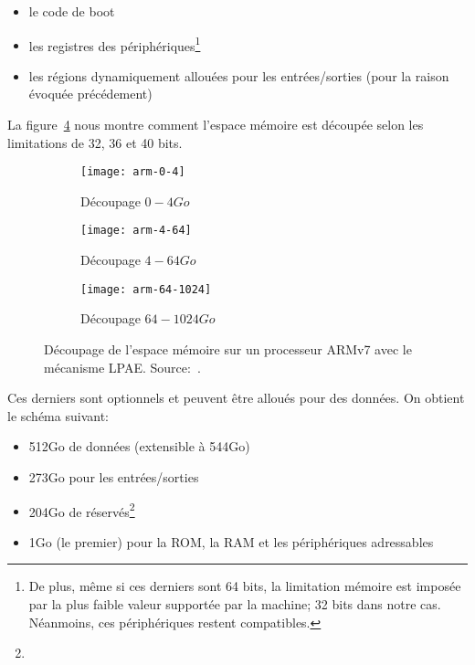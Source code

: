     \begin{itemize}
      \item le code de boot
      \item les registres des périphériques\footnote{De plus, même si ces
        derniers sont 64 bits, la limitation mémoire est imposée par la plus
        faible valeur supportée par la machine; 32 bits dans notre
        cas. Néanmoins, ces périphériques restent compatibles.}
      \item les régions dynamiquement allouées pour les entrées/sorties (pour la
        raison évoquée précédement)
    \end{itemize}

    La figure~\ref{fig:arm-0-1024} nous montre comment l'espace mémoire est
    découpée selon les limitations de 32, 36 et 40 bits.

    \begin{figure}[h]
      \begin{subfigure}[b]{0.37\textwidth}
        \texttt{[image: arm-0-4]}
        \caption{Découpage $0-4Go$}
        \label{fig:arm-0-4}
      \end{subfigure}
      \begin{subfigure}[b]{0.37\textwidth}
        \texttt{[image: arm-4-64]}
        \caption{Découpage $4-64Go$}
        \label{fig:arm-4-64}
      \end{subfigure}
      \begin{subfigure}[b]{0.23\textwidth}
        \texttt{[image: arm-64-1024]}
        \caption{Découpage $64-1024Go$}
        \label{fig:arm-64-1024}
      \end{subfigure}
      \caption{Découpage de l'espace mémoire sur un processeur ARMv7 avec le
        mécanisme LPAE. Source:~\citeauthor{arm2012principles}.}
      \label{fig:arm-0-1024}
    \end{figure}

    Ces derniers sont optionnels et peuvent être alloués pour des données. On
    obtient le schéma suivant:

    \begin{itemize}
      \item 512Go de données (extensible à 544Go)
      \item 273Go pour les entrées/sorties
      \item 204Go de réservés\footnote{}
      \item 1Go (le premier) pour la ROM, la RAM et les périphériques
        adressables
    \end{itemize}

